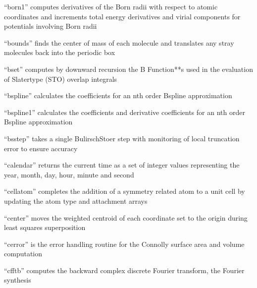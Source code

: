 \documentclass[letterpaper,11pt,english]{sphinxmanual}
\begin{document}
“born1” computes derivatives of the Born radii with respect to atomic coordinates and increments total energy derivatives and virial components for potentials involving Born radii


“bounds” finds the center of mass of each molecule and translates any stray molecules back into the periodic box


“bset” computes by downward recursion the B Function**s used in the evaluation of Slater\sphinxhyphen{}type (STO) overlap integrals


“bspline” calculates the coefficients for an n\sphinxhyphen{}th order B\sphinxhyphen{}spline approximation


“bspline1” calculates the coefficients and derivative coefficients for an n\sphinxhyphen{}th order B\sphinxhyphen{}spline approximation


“bsstep” takes a single Bulirsch\sphinxhyphen{}Stoer step with monitoring of local truncation error to ensure accuracy


“calendar” returns the current time as a set of integer values representing the year, month, day, hour, minute and second


“cellatom” completes the addition of a symmetry related atom to a unit cell by updating the atom type and attachment arrays


“center” moves the weighted centroid of each coordinate set to the origin during least squares superposition


“cerror” is the error handling routine for the Connolly surface area and volume computation


“cfftb” computes the backward complex discrete Fourier transform, the Fourier synthesis

\end{document}
